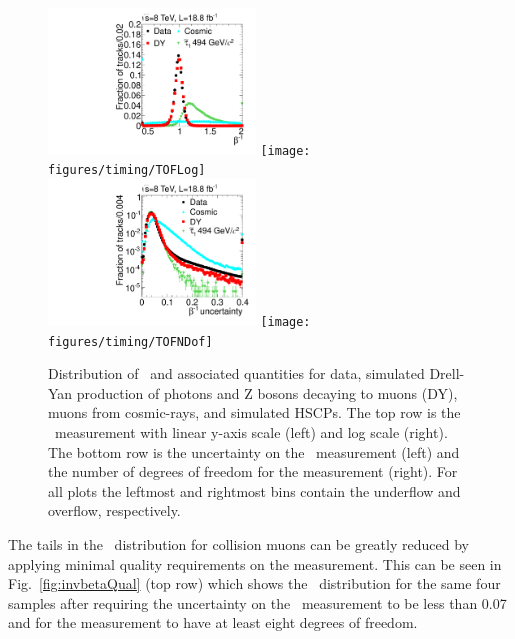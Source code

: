 \begin{figure}
  \begin{center}
      \includegraphics[width=0.49\textwidth]{figures/timing/TOF}
      \texttt{[image: figures/timing/TOFLog]} \\
      \includegraphics[width=0.49\textwidth]{figures/timing/TOFErr}
      \texttt{[image: figures/timing/TOFNDof]} \\
      \caption[Distribution of \invbeta\ and associated quantities]
      {Distribution of \invbeta\ and associated quantities for data,
simulated Drell-Yan production of photons and Z bosons decaying to muons (DY), muons from cosmic-rays, and simulated HSCPs.
The top row is the \invbeta\ measurement with linear y-axis scale (left) and log scale (right).
The bottom row is the uncertainty on the \invbeta\ measurement (left) and the number of degrees of freedom for the measurement (right).
For all plots the leftmost and rightmost bins contain the underflow and overflow, respectively.
        }
      \label{fig:invbeta}
  \end{center}
\end{figure}

The tails in the \invbeta\ distribution for collision muons can be greatly reduced by applying minimal quality requirements on the measurement.
This can be seen in Fig.~\ref{fig:invbetaQual} (top row) which shows the \invbeta\ distribution for the same
four samples after requiring the uncertainty on the \invbeta\ measurement
to be less than 0.07 and for the measurement to have at least eight degrees of freedom.

